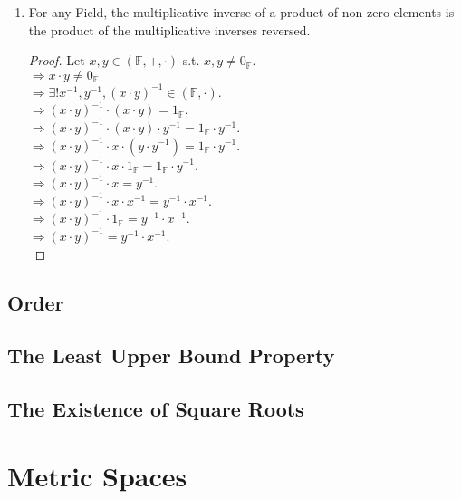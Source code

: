 \documentclass{article}
\begin{document}
\begin{enumerate}
				\item For any Field, the multiplicative inverse of a product of non-zero elements is the product of the multiplicative inverses reversed. \\
				\begin{proof}
					Let $x, y \in (\mathbb{F}, +, \cdot)$ s.t. $x, y \neq 0_{\mathbb{F}}$. \\
					$\Rightarrow x \cdot y \neq 0_\mathbb{F}$ \\
					$\Rightarrow \exists ! x^{-1}, y^{-1}, (x \cdot y)^{-1} \in (\mathbb{F}, \cdot)$. \\
					$\Rightarrow (x \cdot y)^{-1} \cdot (x \cdot y) = 1_\mathbb{F}$. \\
					$\Rightarrow (x \cdot y)^{-1} \cdot (x \cdot y) \cdot y^{-1} = 1_\mathbb{F} \cdot y^{-1}$. \\
					$\Rightarrow (x \cdot y)^{-1} \cdot x \cdot (y \cdot y^{-1}) = 1_\mathbb{F} \cdot y^{-1}$. \\
					$\Rightarrow (x \cdot y)^{-1} \cdot x \cdot 1_\mathbb{F} = 1_\mathbb{F} \cdot y^{-1}$. \\
					$\Rightarrow (x \cdot y)^{-1} \cdot x = y^{-1}$. \\
					$\Rightarrow (x \cdot y)^{-1} \cdot x \cdot x^{-1} = y^{-1} \cdot x^{-1}$. \\
					$\Rightarrow (x \cdot y)^{-1} \cdot 1_\mathbb{F} = y^{-1} \cdot x^{-1}$. \\
					$\Rightarrow (x \cdot y)^{-1} = y^{-1} \cdot x^{-1}$. \\
				\end{proof}
			\end{enumerate}

		\subsection{Order}
		
		\subsection{The Least Upper Bound Property}
		
		\subsection{The Existence of Square Roots}

	
	\section{Metric Spaces}
\end{document}
